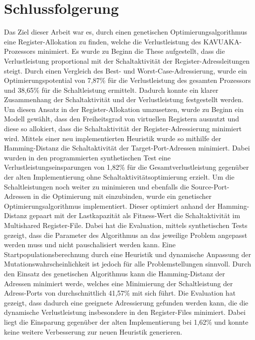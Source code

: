 \chapter{Schlussfolgerung}
\label{chap:schlussfolgerung}
Das Ziel dieser Arbeit war es, durch einen genetischen Optimierungsalgorithmus eine Register-Allokation zu finden, welche die Verlustleistung des KAVUAKA-Prozessors minimiert. Es wurde zu Beginn die These aufgestellt, dass die Verlustleistung proportional mit der Schaltaktivität der Register-Adressleitungen steigt. Durch einen Vergleich des Best- und Worst-Case-Adressierung, wurde ein Optimierungspotential von 7,87\% für die Verlustleistung des gesamten Prozessors und 38,65\% für die Schaltleistung ermittelt. Dadurch konnte ein klarer Zusammenhang der Schaltaktivität und der Verlustleistung festgestellt werden. Um diesen Ansatz in der Register-Allokation umzusetzen, wurde zu Beginn ein Modell gewählt, dass den Freiheitsgrad von virtuellen Registern ausnutzt und diese so allokiert, dass die Schaltaktivität der Register-Adressierung minimiert wird. Mittels einer neu implementierten Heuristik wurde so mithilfe der Hamming-Distanz die Schaltaktivität der Target-Port-Adressen minimiert. Dabei wurden in den programmierten synthetischen Test eine Verlustleistungseinsparungen von 1,82\% für die Gesamtverlustleistung gegenüber der alten Implementierung ohne Schaltaktivitätsoptimierung erzielt.
Um die Schaltleistungen noch weiter zu minimieren und ebenfalls die Source-Port-Adressen in die Optimierung mit einzubinden, wurde ein genetischer Optimierungsalgorithmus implementiert. Dieser optimiert anhand der Hamming-Distanz gepaart mit der Lastkapazität als Fitness-Wert die Schaltaktivität im Multishared Register-File. Dabei hat die Evaluation, mittels synthetischen Tests gezeigt, dass die Parameter des Algorithmus an das jeweilige Problem angepasst werden muss und nicht pauschalisiert werden kann. Eine Startpopulationsberechnung durch eine Heuristik und dynamische Anpassung der Mutationswahrscheinlichkeit ist jedoch für alle Problemstellungen sinnvoll.
Durch den Einsatz des genetischen Algorithmus kann die Hamming-Distanz der Adressen minimiert werde, welches eine Minimierung der Schaltleistung der Adress-Ports von durchschnittlich 41,57\% mit sich führt.  
Die Evaluation hat gezeigt, dass dadurch eine geeignete Adressierung gefunden werden kann, die die dynamische Verlustleistung insbesondere in den Register-Files minimiert. Dabei liegt die Einsparung gegenüber der alten Implementierung bei 1,62\% und konnte keine weitere Verbesserung zur neuen Heuristik generieren.
